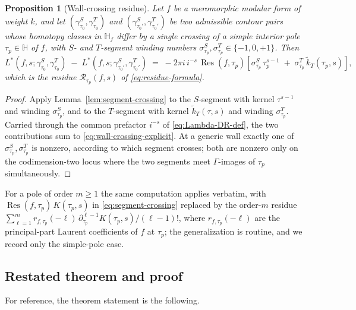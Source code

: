 \documentclass[11pt]{article}
\newtheorem{proposition}[theorem]{Proposition}
\numberwithin{equation}{section}  %
\newcommand{\HH}{\mathbb{H}}
\DeclareMathOperator{\Res}{Res}
\begin{document}
\begin{proposition}[Wall-crossing residue]\label{prop:wall-crossing-residue}
Let $f$ be a meromorphic modular form of weight $k$, and let
$(\gamma^S_{\tau_0}, \gamma^T_{\tau_0})$ and
$(\gamma^S_{\tau_0'}, \gamma^T_{\tau_0'})$ be two admissible contour
pairs whose homotopy classes in $\HH_f$ differ by a single crossing of
a simple interior pole $\tau_p \in \HH$ of $f$, with $S$- and
$T$-segment winding numbers
$\sigma^S_{\tau_p}, \sigma^T_{\tau_p} \in \{-1, 0, +1\}$.  Then
\begin{equation}\label{eq:wall-crossing-explicit}
  L^*(f, s; \gamma^S_{\tau_0}, \gamma^T_{\tau_0})
  \;-\; L^*(f, s; \gamma^S_{\tau_0'}, \gamma^T_{\tau_0'})
  \;=\; -2\pi i\,i^{-s}\,\Res(f, \tau_p)\!\left[
    \sigma^S_{\tau_p}\,\tau_p^{s-1} \;+\; \sigma^T_{\tau_p}\,\widetilde{k}_T(\tau_p, s)
  \right],
\end{equation}
which is the residue $\mathcal{R}_{\tau_p}(f, s)$ of
\eqref{eq:residue-formula}.
\end{proposition}
\begin{proof}
Apply Lemma~\ref{lem:segment-crossing} to the $S$-segment with kernel
$\tau^{s-1}$ and winding $\sigma^S_{\tau_p}$, and to the $T$-segment
with kernel $\widetilde{k}_T(\tau, s)$ and winding $\sigma^T_{\tau_p}$.
Carried through the common prefactor $i^{-s}$ of
\eqref{eq:Lambda-DR-def}, the two contributions sum to
\eqref{eq:wall-crossing-explicit}.  At a generic wall exactly one of
$\sigma^S_{\tau_p}, \sigma^T_{\tau_p}$ is nonzero, according to which
segment crosses; both are nonzero only on the codimension-two locus
where the two segments meet $\Gamma$-images of $\tau_p$ simultaneously.
\end{proof}

For a pole of order $m \ge 1$ the same computation applies verbatim,
with $\Res(f, \tau_p)\,K(\tau_p, s)$ in \eqref{eq:segment-crossing}
replaced by the order-$m$ residue
$\sum_{\ell = 1}^{m} r_{f, \tau_p}(-\ell)\,\partial_{\tau_p}^{\ell - 1} K(\tau_p, s)/(\ell - 1)!$,
where $r_{f, \tau_p}(-\ell)$ are the principal-part Laurent
coefficients of $f$ at $\tau_p$; the generalization is routine, and we
record only the simple-pole case.

\subsection{Restated theorem and proof}\label{subsec:wall-crossing-proof}

For reference, the theorem statement is the following.
\end{document}
